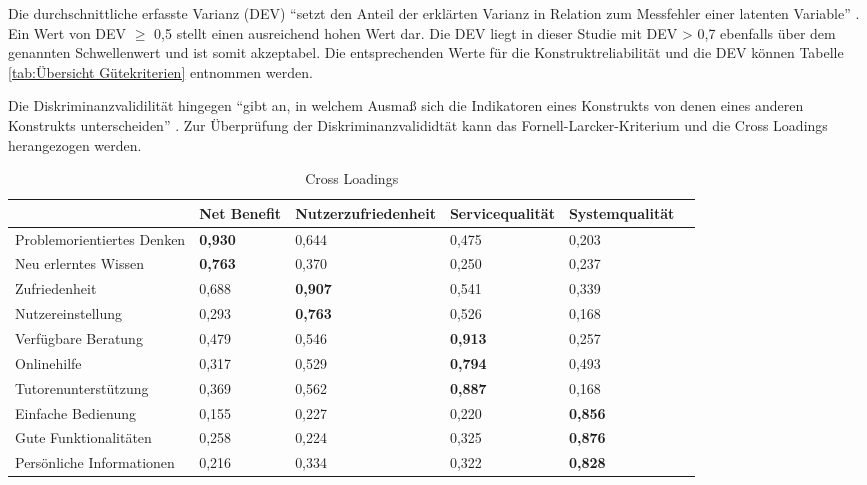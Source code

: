 Die durchschnittliche erfasste Varianz (DEV) "`setzt den Anteil der erklärten Varianz in Relation zum Messfehler einer latenten Variable"'  \parencite[S.25]{nitzl2010anwenderorientierte}. Ein Wert von DEV $\geq$ 0,5 stellt einen ausreichend hohen Wert dar. Die DEV liegt in dieser Studie mit DEV > 0,7 ebenfalls über dem genannten Schwellenwert und ist somit akzeptabel. Die entsprechenden Werte für die Konstruktreliabilität und die DEV können Tabelle \ref{tab:Übersicht Gütekriterien} entnommen werden. 

Die Diskriminanzvalidilität hingegen "`gibt an, in welchem Ausmaß sich die Indikatoren eines Konstrukts von denen eines anderen Konstrukts unterscheiden"' \parencite[S.26]{nitzl2010anwenderorientierte}. Zur Überprüfung der Diskriminanzvalididtät kann das Fornell-Larcker-Kriterium und die Cross Loadings herangezogen werden.


\begin{table}[h] 
\footnotesize
\caption{Cross Loadings}
\label{tab:Cross-Loadings} 
\begin{tabular}{@{}llllll@{}} \toprule

 & \textbf{Net Benefit} & \textbf{Nutzerzufriedenheit} & \textbf{Servicequalität} & \textbf{Systemqualität} \\ \midrule

Problemorientiertes Denken 	& \textbf{0,930}	& 0,644	& 0,475	& 0,203	\\

Neu erlerntes Wissen	& \textbf{0,763}	& 0,370 	& 0,250 	& 0,237	\\ 

Zufriedenheit 			& 0,688 		& \textbf{0,907} & 0,541	& 0,339	\\

Nutzereinstellung		& 0,293		& \textbf{0,763}	 & 0,526 & 0,168 \\
 
Verfügbare Beratung		& 0,479 		& 0,546 	&\textbf{0,913}	& 0,257		\\

Onlinehilfe 			& 0,317 		& 0,529	& \textbf{0,794}	& 0,493 		\\

Tutorenunterstützung	& 0,369 		& 0,562 	& \textbf{0,887}	& 0,168		\\ 

Einfache Bedienung		& 0,155 		& 0,227 	& 0,220	& \textbf{0,856}	\\ 

Gute Funktionalitäten 	& 0,258 		& 0,224	& 0,325	& \textbf{0,876} 		\\ 
 
Persönliche Informationen & 0,216 	& 0,334 	& 0,322	& \textbf{0,828}	\\	
		 
 \bottomrule
 
\end{tabular}	
\end{table}



